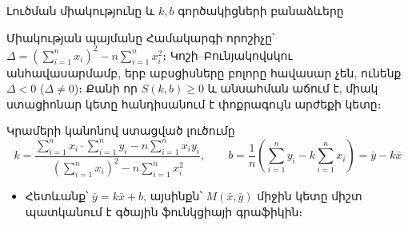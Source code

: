 \documentclass[aspectratio=169,11pt]{beamer}
\begin{document}
\begin{frame}{Լուծման միակությունը և $k, b$ գործակիցների բանաձևերը}
    \begin{block}{Միակության պայմանը}
        Համակարգի որոշիչը՝ $\Delta = \left(\sum_{i=1}^n x_i\right)^2 - n \sum_{i=1}^n x_i^2$։ Կոշի–Բունյակովսկու անհավասարմամբ, երբ աբսցիսները բոլորը հավասար չեն, ունենք $\Delta < 0$ ($\Delta \neq 0$)։ Քանի որ $S(k, b) \geqslant 0$ և անսահման աճում է, միակ ստացիոնար կետը հանդիսանում է փոքրագույն արժեքի կետը։
    \end{block}

    \begin{block}{Կրամերի կանոնով ստացված լուծումը}
        \[
        k = \frac{\sum_{i=1}^n x_i \cdot \sum_{i=1}^n y_i - n \sum_{i=1}^n x_i y_i}{\left(\sum_{i=1}^n x_i\right)^2 - n \sum_{i=1}^n x_i^2},
        \qquad
        b = \frac{1}{n}\left(\sum_{i=1}^n y_i - k\sum_{i=1}^n x_i\right) = \bar{y} - k\bar{x}
        \]
    \end{block}

    \begin{itemize}
        \item Հետևանք՝ $\bar{y} = k\bar{x} + b$, այսինքն՝ $M(\bar{x}, \bar{y})$ միջին կետը միշտ պատկանում է գծային ֆունկցիայի գրաֆիկին։
    \end{itemize}
\end{frame}
\end{document}
